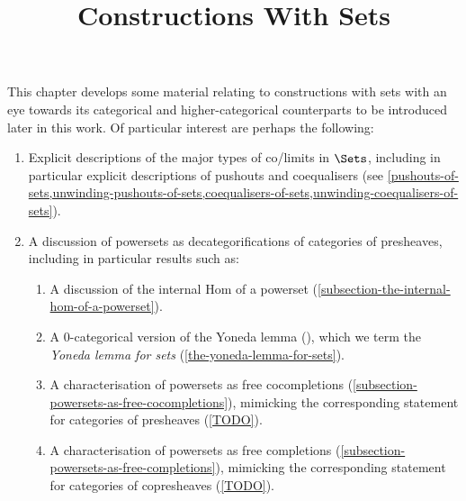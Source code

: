 

%



\title{Constructions With Sets}

\maketitle

\label{section-phantom}

This chapter develops some material relating to constructions with sets with an eye towards its categorical and higher-categorical counterparts to be introduced later in this work. Of particular interest are perhaps the following:
\begin{enumerate}
    \item\label{constructions-with-sets-introduction-item-1}Explicit descriptions of the major types of co/limits in $\Sets$, including in particular explicit descriptions of pushouts and coequalisers (see \cref{pushouts-of-sets,unwinding-pushouts-of-sets,coequalisers-of-sets,unwinding-coequalisers-of-sets}).
    \item\label{constructions-with-sets-introduction-item-2}A discussion of powersets as decategorifications of categories of presheaves, including in particular results such as:
        \begin{enumerate}
            \item\label{constructions-with-sets-introduction-item-2a}A discussion of the internal Hom of a powerset (\cref{subsection-the-internal-hom-of-a-powerset}).
            \item\label{constructions-with-sets-introduction-item-2b}A 0-categorical version of the Yoneda lemma (), which we term the \textit{Yoneda lemma for sets} (\cref{the-yoneda-lemma-for-sets}).
            \item\label{constructions-with-sets-introduction-item-2c}A characterisation of powersets as free cocompletions (\cref{subsection-powersets-as-free-cocompletions}), mimicking the corresponding statement for categories of presheaves (\cref{TODO}).
            \item\label{constructions-with-sets-introduction-item-2d}A characterisation of powersets as free completions (\cref{subsection-powersets-as-free-completions}), mimicking the corresponding statement for categories of copresheaves (\cref{TODO}).

\end{enumerate}
\end{enumerate}
